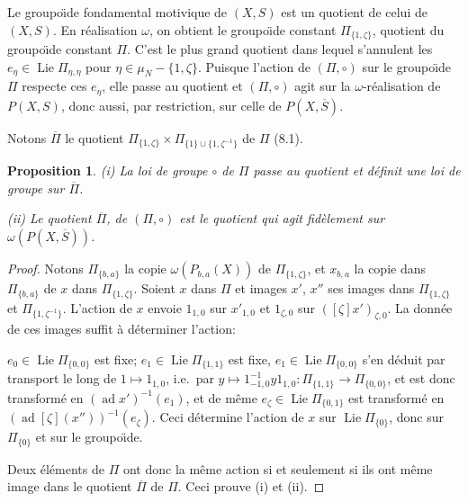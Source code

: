 \documentclass[11pt,a4paper]{article}
\theoremstyle{plain}
\newtheorem{proposition}[theorem]{Proposition}
\theoremstyle{definition}
\DeclareMathOperator{\Lie}{Lie}
\DeclareMathOperator{\ad}{ad}
\begin{document}
Le groupo\"{\i}de fondamental motivique de $(X, S)$ est un quotient de celui de $(X, S)$. En r\'ealisation $\omega$, on obtient le groupo\"{\i}de constant $\Pi_{\{1,\zeta\}}$, quotient du groupo\"{\i}de constant $\Pi$. C'est le plus grand quotient dans lequel s'annulent les $e_\eta \in \Lie \Pi_{\eta,\eta}$ pour $\eta \in \mu_N - \{1, \zeta\}$. Puisque l'action de $(\Pi, \circ)$ sur le groupo\"{\i}de $\Pi$ respecte ces $e_\eta$, elle passe au quotient et $(\Pi, \circ)$ agit sur la $\omega$-r\'ealisation de $P(X, S)$, donc aussi, par restriction, sur celle de $P(X, \overline{S})$.

Notons $\overline{\Pi}$ le quotient $\Pi_{\{1,\zeta\}} \times \Pi_{\{1\} \cup \{1,\zeta^{-1}\}}$ de $\Pi$ (8.1).

\begin{proposition}\label{prop:8.4}
\emph{(i)} La loi de groupe $\circ$ de $\Pi$ passe au quotient et d\'efinit une loi de groupe sur $\overline{\Pi}$.

\emph{(ii)} Le quotient $\overline{\Pi}$, de $(\Pi, \circ)$ est le quotient qui agit fid\`element sur $\omega(P(X, \overline{S}))$.
\end{proposition}

\begin{proof}
Notons $\Pi_{\{b,a\}}$ la copie $\omega(P_{b,a}(X))$ de $\Pi_{\{1,\zeta\}}$, et $x_{b,a}$ la copie dans $\Pi_{\{b,a\}}$ de $x$ dans $\Pi_{\{1,\zeta\}}$. Soient $x$ dans $\Pi$ et images $x'$, $x''$ ses images dans $\Pi_{\{1,\zeta\}}$ et $\Pi_{\{1,\zeta^{-1}\}}$. L'action de $x$ envoie $1_{1,0}$ sur $x'_{1,0}$ et $1_{\zeta,0}$ sur $([\zeta]x')_{\zeta,0}$. La donn\'ee de ces images suffit \`a d\'eterminer l'action:

$e_0 \in \Lie \Pi_{\{0,0\}}$ est fixe; $e_1 \in \Lie \Pi_{\{1,1\}}$ est fixe, $e_1 \in \Lie \Pi_{\{0,0\}}$ s'en d\'eduit par transport le long de $1 \mapsto 1_{1,0}$, i.e.~par $y \mapsto 1^{-1}_{-1,0} y 1_{1,0}: \Pi_{\{1,1\}} \to \Pi_{\{0,0\}}$, et est donc transform\'e en $(\ad x')^{-1}(e_1)$, et de m\^eme $e_\zeta \in \Lie \Pi_{\{0,1\}}$ est transform\'e en $(\ad [\zeta](x''))^{-1}(e_\zeta)$. Ceci d\'etermine l'action de $x$ sur $\Lie \Pi_{\{0\}}$, donc sur $\Pi_{\{0\}}$ et sur le groupo\"{\i}de.

Deux \'el\'ements de $\Pi$ ont donc la m\^eme action si et seulement si ils ont m\^eme image dans le quotient $\overline{\Pi}$ de $\Pi$. Ceci prouve (i) et (ii).
\end{proof}
\end{document}
